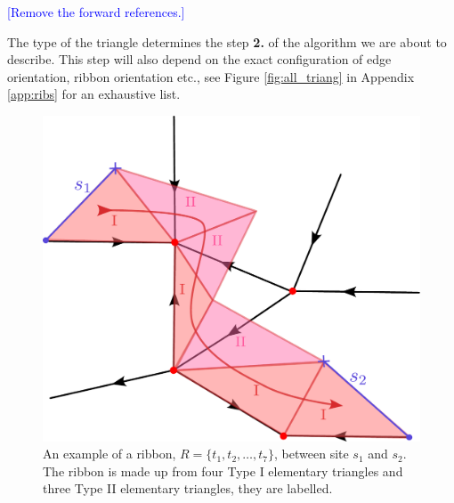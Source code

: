 \documentclass[two column]{article}
\newcommand{\caro}[1]{\textcolor{red}{[#1]}}
\newcommand{\jovan}[1]{\textcolor{blue}{[#1]}}
\begin{document}
\jovan{Remove the forward references.}

The type of the triangle determines the step \textbf{2.} of the algorithm we are about to describe. This step will also depend on the exact configuration of edge orientation, ribbon orientation etc., see Figure \ref{fig:all_triang} in Appendix \ref{app:ribs} for an exhaustive list.


\begin{figure}
    \centering
    \includegraphics[width= \linewidth]{Figures/ribbon_exmpl.pdf}
    \caption{An example of a ribbon, $R = \{t_1, t_2, \ldots, t_7\}$, between site $s_1$ and $s_2$. The ribbon is made up from four Type I elementary triangles and three Type II elementary triangles, they are labelled.}
    \label{fig:rib_exampl}
\end{figure}


\end{document}
